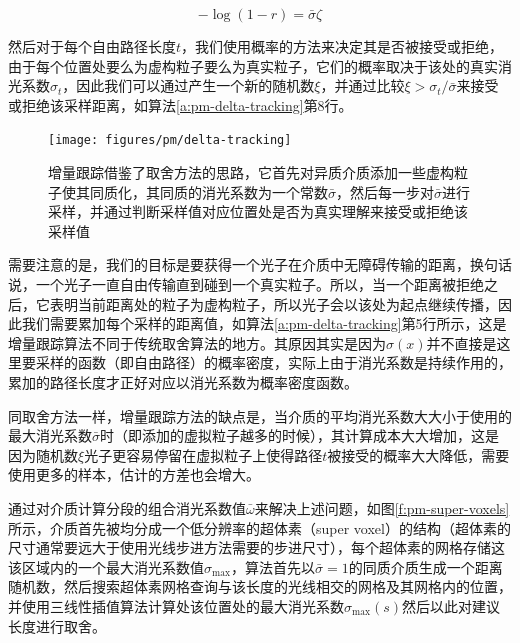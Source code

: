 \begin{equation}
	-\log(1-r)=\bar{\sigma}\zeta
\end{equation}

然后对于每个自由路径长度$t$，我们使用概率的方法来决定其是否被接受或拒绝，由于每个位置处要么为虚构粒子要么为真实粒子，它们的概率取决于该处的真实消光系数$\sigma_t$，因此我们可以通过产生一个新的随机数$\xi$，并通过比较$\xi>\sigma_t/\bar{\sigma}$来接受或拒绝该采样距离，如算法\ref{a:pm-delta-tracking}第8行。

\begin{figure}
	\texttt{[image: figures/pm/delta-tracking]}
	\caption{增量跟踪借鉴了取舍方法的思路，它首先对异质介质添加一些虚构粒子使其同质化，其同质的消光系数为一个常数$\bar{\sigma}$，然后每一步对$\bar{\sigma}$进行采样，并通过判断采样值对应位置处是否为真实理解来接受或拒绝该采样值}
	\label{f:pm-delta-tracking}
\end{figure}

需要注意的是，我们的目标是要获得一个光子在介质中无障碍传输的距离，换句话说，一个光子一直自由传输直到碰到一个真实粒子。所以，当一个距离被拒绝之后，它表明当前距离处的粒子为虚构粒子，所以光子会以该处为起点继续传播，因此我们需要累加每个采样的距离值，如算法\ref{a:pm-delta-tracking}第5行所示，这是增量跟踪算法不同于传统取舍算法的地方。其原因其实是因为$\sigma(x)$并不直接是这里要采样的函数（即自由路径）的概率密度，实际上由于消光系数是持续作用的，累加的路径长度才正好对应以消光系数为概率密度函数。

同取舍方法一样，增量跟踪方法的缺点是，当介质的平均消光系数大大小于使用的最大消光系数$\bar{\sigma}$时（即添加的虚拟粒子越多的时候），其计算成本大大增加，这是因为随机数$\xi$光子更容易停留在虚拟粒子上使得路径$t$被接受的概率大大降低，需要使用更多的样本，估计的方差也会增大。

\cite{a:FreePathSamplinginHighResolutionInhomogeneousParticipatingMedia}通过对介质计算分段的组合消光系数值$\bar{\omega}$来解决上述问题，如图\ref{f:pm-super-voxels}所示，介质首先被均分成一个低分辨率的超体素（super voxel）的结构（超体素的尺寸通常要远大于使用光线步进方法需要的步进尺寸），每个超体素的网格存储这该区域内的一个最大消光系数值$\sigma_{\max}$，算法首先以$\bar{\sigma}=1$的同质介质生成一个距离随机数，然后搜索超体素网格查询与该长度的光线相交的网格及其网格内的位置，并使用三线性插值算法计算处该位置处的最大消光系数$\sigma_{\max}(s)$然后以此对建议长度进行取舍。

